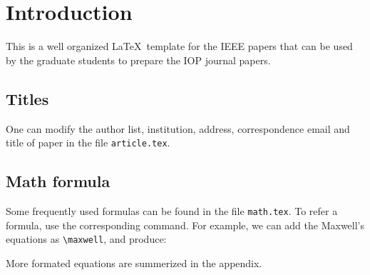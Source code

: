 

\section{Introduction}
\label{sec:introduction}


This is a well organized \LaTeX ~template for the IEEE papers that can be used by  the graduate students to prepare the IOP journal papers.



\subsection{Titles}

One can modify the author list, institution, address, correspondence email and title of paper in the file \verb+article.tex+.



\subsection{Math formula}

Some frequently used formulas can be found in the file \verb+math.tex+.
To refer a formula, use the corresponding command.
For example, we can add the Maxwell's equations as \verb+\maxwell+, and produce:


More formated equations are summerized  in the appendix.




